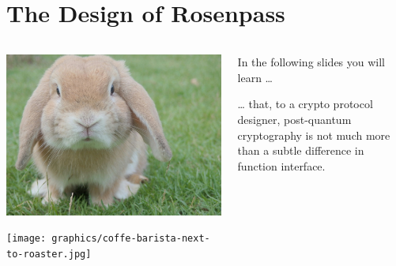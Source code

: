 \section{The Design of Rosenpass}

\begin{frame}[light]{}
  \vspace{1cm}
  \large
  \vollkorn

  \begin{columns}[c]
    \begin{column}{.30\linewidth}
      \includegraphics[width=.6\linewidth,right,padding=-.2cm .2cm 0cm .2cm]{graphics/bunny-looking-at-camera.jpg}
      \par
      \texttt{[image: graphics/coffe-barista-next-to-roaster.jpg]}
    \end{column}

    \begin{column}{.40\linewidth}


      In the following slides you will learn …
      \par\vspace{1.5em}
      … that, to a crypto protocol designer, post-quantum cryptography is not much more than a subtle difference in function interface.
    \end{column}
  \end{columns}
\end{frame}

